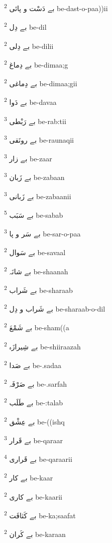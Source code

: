 \documentclass[12pt]{article}
\begin{document}
\begin{RTL}
\begin{multicols}{5}
{\ur بے دَسْت و پائی}   \textsuperscript{2} be-dast-o-paa))ii

{\ur بے دِل}   \textsuperscript{2} be-dil

{\ur بے دِلی}   \textsuperscript{2} be-dilii

{\ur بے دِماغ}   \textsuperscript{2} be-dimaa;g

{\ur بے دِماغی}   \textsuperscript{2} be-dimaa;gii

{\ur بے دَوا}   \textsuperscript{2} be-davaa

{\ur بے رَبْطی}   \textsuperscript{3} be-rab:tii

{\ur بے رونَقی}   \textsuperscript{3} be-raunaqii

{\ur بے زار}   \textsuperscript{3} be-zaar

{\ur بے زَبان}   \textsuperscript{3} be-zabaan

{\ur بے زَبانی}   \textsuperscript{3} be-zabaanii

{\ur بے سَبَب}   \textsuperscript{5} be-sabab

{\ur بے سَر و پا}   \textsuperscript{3} be-sar-o-paa

{\ur بے سَوال}   \textsuperscript{2} be-savaal

{\ur بے شانَہ}   \textsuperscript{2} be-shaanah

{\ur بے شَراب}   \textsuperscript{2} be-sharaab

{\ur بے شَراب و دِل}   \textsuperscript{2} be-sharaab-o-dil

{\ur بے شَمْعَ}   \textsuperscript{2} be-sham((a

{\ur بے شِیرازَہ}   \textsuperscript{2} be-shiiraazah

{\ur بے صَدا}   \textsuperscript{2} be-.sadaa

{\ur بے صَرْفَہ}   \textsuperscript{2} be-.sarfah

{\ur بے طَلَب}   \textsuperscript{2} be-:talab

{\ur بے عِشْق}   \textsuperscript{2} be-((ishq

{\ur بے قَرار}   \textsuperscript{3} be-qaraar

{\ur بے قَراری}   \textsuperscript{4} be-qaraarii

{\ur بے کار}   \textsuperscript{2} be-kaar

{\ur بے کاری}   \textsuperscript{2} be-kaarii

{\ur بے کَثافَت}   \textsuperscript{2} be-ka;saafat

{\ur بے کَران}   \textsuperscript{2} be-karaan


\end{multicols}
\end{RTL}
\end{document}
